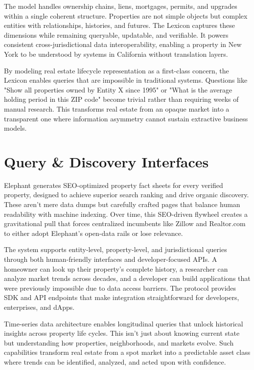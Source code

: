 The model handles ownership chains, liens, mortgages, permits, and upgrades within a single coherent structure. Properties are not simple objects but complex entities with relationships, histories, and futures. The Lexicon captures these dimensions while remaining queryable, updatable, and verifiable. It powers consistent cross-jurisdictional data interoperability, enabling a property in New York to be understood by systems in California without translation layers.

By modeling real estate lifecycle representation as a first-class concern, the Lexicon enables queries that are impossible in traditional systems. Questions like "Show all properties owned by Entity X since 1995" or "What is the average holding period in this ZIP code" become trivial rather than requiring weeks of manual research. This transforms real estate from an opaque market into a transparent one where information asymmetry cannot sustain extractive business models.

\section{Query \& Discovery Interfaces}

Elephant generates SEO-optimized property fact sheets for every verified property, designed to achieve superior search ranking and drive organic discovery. These aren't mere data dumps but carefully crafted pages that balance human readability with machine indexing. Over time, this SEO-driven flywheel creates a gravitational pull that forces centralized incumbents like Zillow and Realtor.com to either adopt Elephant's open-data rails or lose relevance.

The system supports entity-level, property-level, and jurisdictional queries through both human-friendly interfaces and developer-focused APIs. A homeowner can look up their property's complete history, a researcher can analyze market trends across decades, and a developer can build applications that were previously impossible due to data access barriers. The protocol provides SDK and API endpoints that make integration straightforward for developers, enterprises, and dApps.

Time-series data architecture enables longitudinal queries that unlock historical insights across property life cycles. This isn't just about knowing current state but understanding how properties, neighborhoods, and markets evolve. Such capabilities transform real estate from a spot market into a predictable asset class where trends can be identified, analyzed, and acted upon with confidence.

